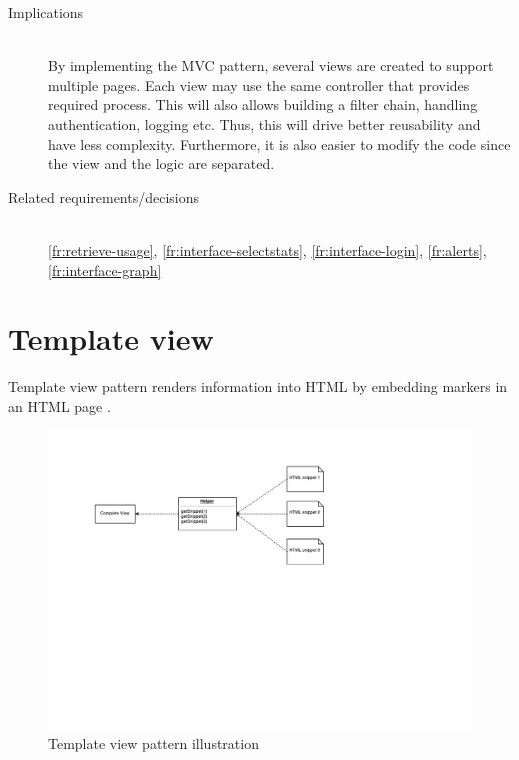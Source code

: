 \begin{description}
\begin{enumerate}
\end{enumerate}

\item [Implications]~\\
By implementing the MVC pattern, several views are created to support multiple pages. Each view may use the same controller that provides required process. This will also allows building a filter chain, handling authentication, logging etc. Thus, this will drive better reusability and have less complexity. Furthermore, it is also easier to modify the code since the view and the logic are separated.

\item [Related requirements/decisions]~\\
\ref{fr:retrieve-usage}, \ref{fr:interface-selectstats}, \ref{fr:interface-login}, \ref{fr:alerts}, \ref{fr:interface-graph} 

\end{description}



\section{Template view}
Template view pattern renders information into HTML by embedding markers in an HTML page \cite{Fowler:2002:PEA:579257}.
	
\begin{figure}[H]
\centering
\includegraphics[scale=0.8]{4-analysis/images/analysis-template-view.pdf}
\caption{Template view pattern illustration \cite{Fowler:2002:PEA:579257}}
\label{fig:analysis-template-view}
\end{figure}

